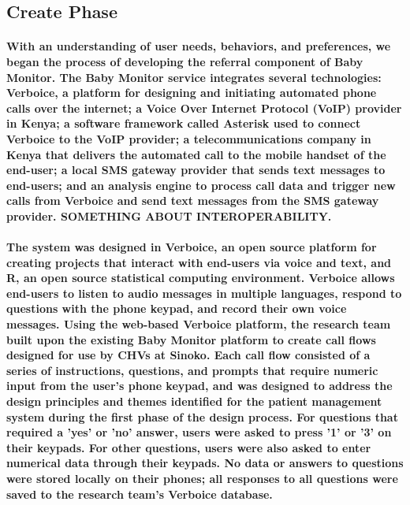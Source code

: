 \subsection{Create Phase}
\paragraph{With an understanding of user needs, behaviors, and preferences, we began the process of developing the referral component of Baby Monitor. The Baby Monitor service integrates several technologies: Verboice, a platform for designing and initiating automated phone calls over the internet; a Voice Over Internet Protocol (VoIP) provider in Kenya; a software framework called Asterisk used to connect Verboice to the VoIP provider; a telecommunications company in Kenya that delivers the automated call to the mobile handset of the end-user; a local SMS gateway provider that sends text messages to end-users; and an analysis engine to process call data and trigger new calls from Verboice and send text messages from the SMS gateway provider. SOMETHING ABOUT INTEROPERABILITY.} 

\paragraph{The system was designed in Verboice, an open source platform for creating projects that interact with end-users via voice and text, and R, an open source statistical computing environment. Verboice allows end-users to listen to audio messages in multiple languages, respond to questions with the phone keypad, and  record their own voice messages. Using the web-based Verboice platform, the research team built upon the existing Baby Monitor platform to create call flows designed for use by CHVs at Sinoko. Each call flow consisted of a series of instructions, questions, and prompts that require numeric input from the user's phone keypad, and was designed to address the design principles and themes identified for the patient management system during the first phase of the design process. For questions that required a 'yes' or 'no' answer, users were asked to press '1' or '3' on their keypads. For other questions, users were also asked to enter numerical data through their keypads. No data or answers to questions were stored locally on their phones; all responses to all questions were saved to the research team's Verboice database.} 

